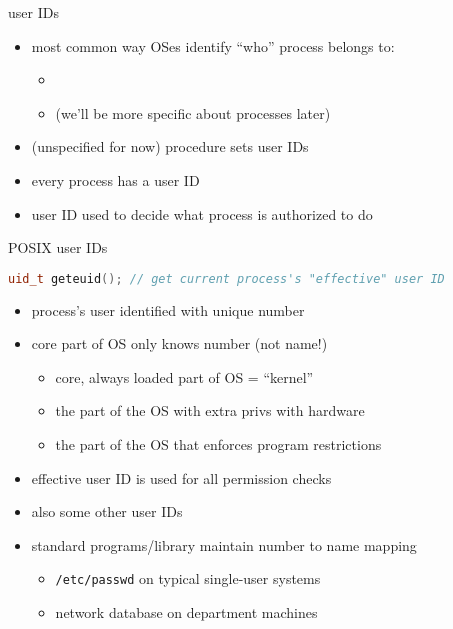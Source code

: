 \begin{frame}{user IDs}
    \begin{itemize}
    \item most common way OSes identify ``who'' process belongs to:
	\begin{itemize}
	\item {}
	\item (we'll be more specific about processes later)
	\end{itemize}
    \vspace{.5cm}
    \item (unspecified for now) procedure sets user IDs
    \item every process has a user ID
    \item user ID used to decide what process is authorized to do
    \end{itemize}
\end{frame}

\begin{frame}[fragile,label=posixUID]{POSIX user IDs}
\begin{lstlisting}[language=C++,style=small]
uid_t geteuid(); // get current process's "effective" user ID
\end{lstlisting}
\begin{itemize}
\item process's user identified with unique number
\item core part of OS only knows number (not name!)
    \begin{itemize}
    \item core, always loaded part of OS = ``kernel''
    \item the part of the OS with extra privs with hardware
    \item the part of the OS that enforces program restrictions
    \end{itemize}
\item effective user ID is used for all permission checks
\item also some other user IDs
\item<2-> standard programs/library maintain number to name mapping
    \begin{itemize}
    \item<2-> \texttt{/etc/passwd} on typical single-user systems
    \item<2-> network database on department machines
    \end{itemize}
\end{itemize}
\end{frame}
